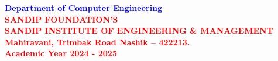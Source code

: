 \begin{titlepage}
\begin{center}
\vspace{0.1in}

\textcolor{blue}{ \small \bf Department of Computer  Engineering}\\

\onehalfspacing
\textcolor{Red}{\large \bf SANDIP FOUNDATION'S}\\
\textcolor{Red}{\small \bf SANDIP INSTITUTE OF ENGINEERING \& MANAGEMENT}\\
\textcolor{Red}{\small \bf Mahiravani, Trimbak Road Nashik – 422213.}\\

\textcolor{Red} {\bf Academic Year 2024 - 2025}


\end{center}

\end{titlepage}
